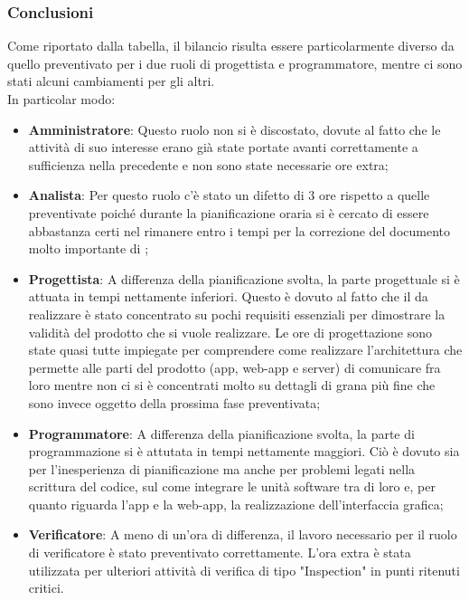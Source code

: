 \subsubsection{Conclusioni}
Come riportato dalla tabella, il bilancio risulta essere particolarmente diverso da quello preventivato per i due ruoli di progettista e programmatore, mentre ci sono stati alcuni cambiamenti per gli altri.\\
In particolar modo:
\begin{itemize}
	\item \textbf{Amministratore}: Questo ruolo non si è discostato, dovute al fatto che le attività di suo interesse erano già state portate avanti correttamente a sufficienza nella precedente  e non sono state necessarie ore extra;
	\item \textbf{Analista}: Per questo ruolo c'è stato un difetto di 3 ore rispetto a quelle preventivate poiché durante la pianificazione oraria si è cercato di essere abbastanza certi nel rimanere entro i tempi per la correzione del documento molto importante di \AdR{};
	\item \textbf{Progettista}: A differenza della pianificazione svolta, la parte progettuale si è attuata in tempi nettamente inferiori. Questo è dovuto al fatto che il  da realizzare è stato concentrato su pochi requisiti essenziali per dimostrare la validità
	del prodotto che si vuole realizzare. Le ore di progettazione sono state quasi tutte impiegate per comprendere come realizzare l'architettura che permette alle parti del prodotto (app, web-app e server) di comunicare fra loro mentre non ci si è concentrati molto su dettagli
	di grana più fine che sono invece oggetto della prossima fase preventivata;
	\item \textbf{Programmatore}: A differenza della pianificazione svolta, la parte di programmazione si è attutata in tempi nettamente maggiori. Ciò è dovuto sia per 
	l'inesperienza di pianificazione ma anche per problemi legati nella scrittura del codice, sul come integrare le unità software tra di loro e, per quanto riguarda l'app e la web-app, la realizzazione dell'interfaccia grafica;
	\item \textbf{Verificatore}: A meno di un'ora di differenza, il lavoro necessario per il ruolo di verificatore è stato preventivato correttamente. L'ora extra è stata utilizzata per ulteriori attività di verifica di tipo "Inspection" in punti ritenuti critici.
\end{itemize}
